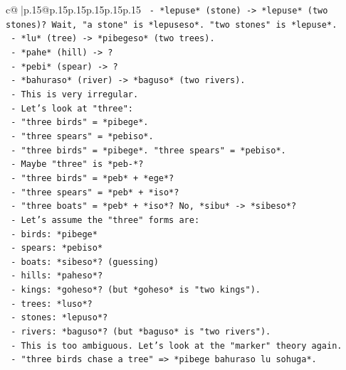 \documentclass{article}
\begin{document}
{\begin{supertabular}{c@{$\;$}|p{.15\linewidth}@{}p{.15\linewidth}p{.15\linewidth}p{.15\linewidth}p{.15\linewidth}p{.15\linewidth}}
{{{\texttt{            {-}   *lepuse* (stone) {-}> *lepuse* (two stones)? Wait, "a stone" is *lepuseso*. "two stones" is *lepuse*.} \\
\texttt{            {-}   *lu* (tree) {-}> *pibegeso* (two trees).} \\
\texttt{            {-}   *pahe* (hill) {-}> ?} \\
\texttt{            {-}   *pebi* (spear) {-}> ?} \\
\texttt{            {-}   *bahuraso* (river) {-}> *baguso* (two rivers).} \\
\texttt{        {-}   This is very irregular.} \\
\texttt{        {-}   Let's look at "three":} \\
\texttt{            {-}   "three birds" = *pibege*.} \\
\texttt{            {-}   "three spears" = *pebiso*.} \\
\texttt{            {-}   "three birds" = *pibege*. "three spears" = *pebiso*.} \\
\texttt{            {-}   Maybe "three" is *peb{-}*?} \\
\texttt{            {-}   "three birds" = *peb* + *ege*?} \\
\texttt{            {-}   "three spears" = *peb* + *iso*?} \\
\texttt{            {-}   "three boats" = *peb* + *iso*? No, *sibu* {-}> *sibeso*?} \\
\texttt{            {-}   Let's assume the "three" forms are:} \\
\texttt{                {-}   birds: *pibege*} \\
\texttt{                {-}   spears: *pebiso*} \\
\texttt{                {-}   boats: *sibeso*? (guessing)} \\
\texttt{                {-}   hills: *paheso*?} \\
\texttt{                {-}   kings: *goheso*? (but *goheso* is "two kings").} \\
\texttt{                {-}   trees: *luso*?} \\
\texttt{                {-}   stones: *lepuso*?} \\
\texttt{                {-}   rivers: *baguso*? (but *baguso* is "two rivers").} \\
\texttt{        {-}   This is too ambiguous. Let's look at the "marker" theory again.} \\
\texttt{        {-}   "three birds chase a tree" => *pibege bahuraso lu sohuga*.} \\
}}}
\end{supertabular}}
\end{document}
